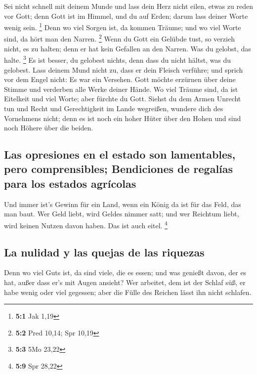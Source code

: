  Sei nicht schnell mit deinem Munde und lass dein Herz
nicht eilen, etwas zu reden vor Gott; denn Gott ist im Himmel, und du
auf Erden; darum lass deiner Worte wenig sein. \footnote{\textbf{5:1}
  Jak 1,19}  Denn wo viel Sorgen ist, da kommen Träume;
und wo viel Worte sind, da hört man den Narren. \footnote{\textbf{5:2}
  Pred 10,14; Spr 10,19}  Wenn du Gott ein Gelübde tust,
so verzieh nicht, es zu halten; denn er hat kein Gefallen an den Narren.
Was du gelobst, das halte. \footnote{\textbf{5:3} 5Mo 23,22}
 Es ist besser, du gelobest nichts, denn dass du nicht
hältst, was du gelobest.  Lass deinem Mund nicht zu, dass
er dein Fleisch verführe; und sprich vor dem Engel nicht: Es war ein
Versehen. Gott möchte erzürnen über deine Stimme und verderben alle
Werke deiner Hände.  Wo viel Träume sind, da ist Eitelkeit
und viel Worte; aber fürchte du Gott.  Siehst du dem Armen
Unrecht tun und Recht und Gerechtigkeit im Lande wegreißen, wundere dich
des Vornehmens nicht; denn es ist noch ein hoher Hüter über den Hohen
und sind noch Höhere über die beiden.

\hypertarget{las-opresiones-en-el-estado-son-lamentables-pero-comprensibles-bendiciones-de-regaluxedas-para-los-estados-agruxedcolas}{%
\subsection{Las opresiones en el estado son lamentables, pero
comprensibles; Bendiciones de regalías para los estados
agrícolas}\label{las-opresiones-en-el-estado-son-lamentables-pero-comprensibles-bendiciones-de-regaluxedas-para-los-estados-agruxedcolas}}

 Und immer ist's Gewinn für ein Land, wenn ein König da
ist für das Feld, das man baut.  Wer Geld liebt, wird
Geldes nimmer satt; und wer Reichtum liebt, wird keinen Nutzen davon
haben. Das ist auch eitel. \footnote{\textbf{5:9} Spr 28,22}

\hypertarget{la-nulidad-y-las-quejas-de-las-riquezas}{%
\subsection{La nulidad y las quejas de las
riquezas}\label{la-nulidad-y-las-quejas-de-las-riquezas}}

 Denn wo viel Guts ist, da sind viele, die es essen; und
was genießt davon, der es hat, außer dass er's mit Augen ansieht?
 Wer arbeitet, dem ist der Schlaf süß, er habe wenig oder
viel gegessen; aber die Fülle des Reichen lässt ihn nicht schlafen.


